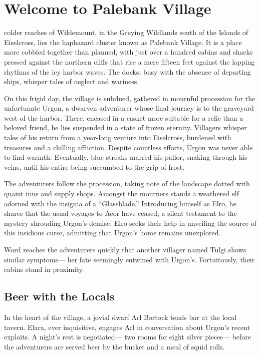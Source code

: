 \documentclass[
  letterpaper,12pt,twoside,twocolumn,openany,
  nodeprecatedcode,bg=full]{dndbook}
\begin{document}
\chapter{Welcome to Palebank Village}\label{welcome-to-palebank-village}

 colder reaches of
Wildemount, in the Greying Wildlands south of the Islands of Eiselcross,
lies the haphazard cluster known as Palebank Village. It is a place more
cobbled together than planned, with just over a hundred cabins and
shacks pressed against the northern cliffs that rise a mere fifteen feet
against the lapping rhythms of the icy harbor waves. The docks, busy
with the absence of departing ships, whisper tales of neglect and
wariness.

On this frigid day, the village is subdued, gathered in mournful
procession for the unfortunate Urgon, a dwarven adventurer whose final
journey is to the graveyard west of the harbor. There, encased in a
casket more suitable for a relic than a beloved friend, he lies
suspended in a state of frozen eternity. Villagers whisper tales of his
return from a year-long venture into Eiselcross, burdened with treasures
and a chilling affliction. Despite countless efforts, Urgon was never
able to find warmth. Eventually, blue streaks marred his pallor, snaking
through his veins, until his entire being succumbed to the grip of
frost.

The adventurers follow the procession, taking note of the landscape
dotted with quaint inns and supply shops. Amongst the mourners stands a
weathered elf adorned with the insignia of a ``Glassblade.'' Introducing
himself as Elro, he shares that the usual voyages to Aeor have ceased, a
silent testament to the mystery shrouding Urgon's demise. Elro seeks
their help in unveiling the source of this insidious curse, admitting
that Urgon's home remains unexplored.

Word reaches the adventurers quickly that another villager named Tulgi
shows similar symptoms--- her fate seemingly entwined with Urgon's.
Fortuitously, their cabins stand in proximity.

\section{Beer with the Locals}\label{beer-with-the-locals}

In the heart of the village, a jovial dwarf Arl Bortock tends bar at the
local tavern. Elara, ever inquisitive, engages Arl in conversation about
Urgon's recent exploits. A night's rest is negotiated--- two rooms for
eight silver pieces--- before the adventurers are served beer by the
bucket and a meal of squid rolls.
\end{document}
